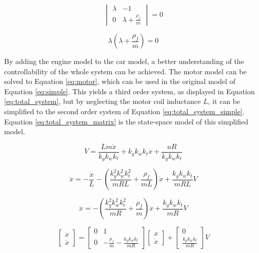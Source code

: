 \documentclass[final]{scrreprt} %
\begin{document}
\begin{equation}
	\begin{vmatrix}
		\lambda & -1 \\
		0 & \lambda + \frac{\rho_f}{m}
	\end{vmatrix} = 0
	\label{eq:char_eq_matrix}
\end{equation}

\begin{equation}
	\lambda(\lambda + \frac{\rho_f}{m}) = 0
	\label{eq:char_eq_final}
\end{equation}

By adding the engine model to the car model, a better understanding of the controllability of the whole system can be achieved. The motor model can be solved to Equation \ref{eq:motor}, which can be used in the original model of Equation \ref{eq:simple}. This yields a third order system, as displayed in Equation \ref{eq:total_system}, but by neglecting the motor coil inductance $L$, it can be simplified to the second order system of Equation \ref{eq:total_system_simple}. Equation \ref{eq:total_system_matrix} is the state-space model of this simplified model.

\begin{equation}
	V = \frac{Lm\ddot{x}}{k_g k_w k_t} + k_g k_w k_t \dot{x} + \frac{uR}{k_g k_w k_t}
	\label{eq:motor}
\end{equation}

\begin{equation}
	\dddot{x} = -\frac{\ddot{x}}{L} -(\frac{k_g^2 k_w^2 k_t^2}{mRL} + \frac{\rho_f}{mL})\dot{x} + \frac{k_g k_w k_t}{mRL}V
	\label{eq:total_system}
\end{equation}

\begin{equation}
	\ddot{x} = -(\frac{k_g^2 k_w^2 k_t^2}{mR} + \frac{\rho_f}{m})\dot{x} + \frac{k_g k_w k_t}{mR}V
	\label{eq:total_system_simple}
\end{equation}

\begin{equation}
	\begin{bmatrix}
		\dot{x} \\
		\ddot{x}
	\end{bmatrix} =
	\begin{bmatrix}
		0 & 1 \\
		0 & -\frac{\rho_f}{m} - \frac{k_g k_w k_t}{mR}
	\end{bmatrix}
	\begin{bmatrix}
		x \\
		\dot{x}
	\end{bmatrix} +
	\begin{bmatrix}
		0 \\
		\frac{k_g k_w k_t}{mR}
	\end{bmatrix}
	V
	\label{eq:total_system_matrix}
\end{equation}
\end{document}
